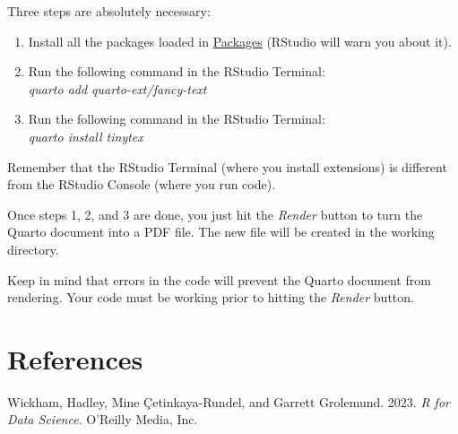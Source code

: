 \documentclass[
  12pt,
  letterpaper,
  DIV=11,
  numbers=noendperiod]{scrartcl}
\newlength{\cslhangindent}
\newlength{\cslentryspacingunit} %
\newenvironment{CSLReferences}[2] %
 {%
  \setlength{\parindent}{0pt}
  \ifodd #1
  \let\oldpar\par
  \def\par{\hangindent=\cslhangindent\oldpar}
  \fi
  \setlength{\parskip}{#2\cslentryspacingunit}
 }%
 {}
\begin{document}
Three steps are absolutely necessary:

\begin{enumerate}
\def\labelenumi{\arabic{enumi}.}
\item
  Install all the packages loaded in
  \protect\hyperlink{packages}{Packages} (RStudio will warn you about
  it).
\item
  Run the following command in the RStudio Terminal:\\
  \emph{quarto add quarto-ext/fancy-text}
\item
  Run the following command in the RStudio Terminal:\\
  \emph{quarto install tinytex}
\end{enumerate}

Remember that the RStudio Terminal (where you install extensions) is
different from the RStudio Console (where you run code).

Once steps 1, 2, and 3 are done, you just hit the \emph{Render} button
to turn the Quarto document into a PDF file. The new file will be
created in the working directory.

Keep in mind that errors in the code will prevent the Quarto document
from rendering. Your code must be working prior to hitting the
\emph{Render} button.

\hypertarget{references}{%
\section*{References}\label{references}}

\hypertarget{refs}{}
\begin{CSLReferences}{1}{0}
\leavevmode{}%
Wickham, Hadley, Mine Çetinkaya-Rundel, and Garrett Grolemund. 2023.
\emph{R for Data Science}. O'Reilly Media, Inc.

\end{CSLReferences}
\end{document}
